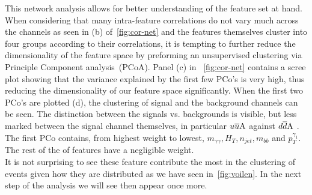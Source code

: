 This network analysis allows for better understanding of the feature set at hand. When considering that many intra-feature correlations do not vary much across the channels as seen in (b) of~\autoref{fig:cor-net} and the features themselves cluster into four groups according to their correlations, it is tempting to further reduce the dimensionality of the feature space by preforming an unsupervised clustering via Principle Component analysis~(PCoA). Panel (c) in ~\autoref{fig:cor-net} contains a scree plot showing that the variance explained by the first few PCo's is very high, thus reducing the dimensionality of our feature space significantly. When the first two PCo's are plotted (d), the clustering of signal and the background channels  can be seen. The distinction between  the signals vs. backgrounds is visible, but less marked between the signal channel themselves, in particular $u\overline u \rm A$ against $d\overline d \rm A$ .  The first PCo contains, from highest weight to lowest, $m_{\gamma \gamma}, H_T, n_{jet}, m_{bb}$ and $p_T^{\gamma_1}$. The rest of the of features have a negligible weight. \\ It is not surprising to see these feature contribute the most in the clustering of events given how they are distributed as we have seen in~\autoref{fig:voilen}. In the next step of the analysis we will see then appear once more.
